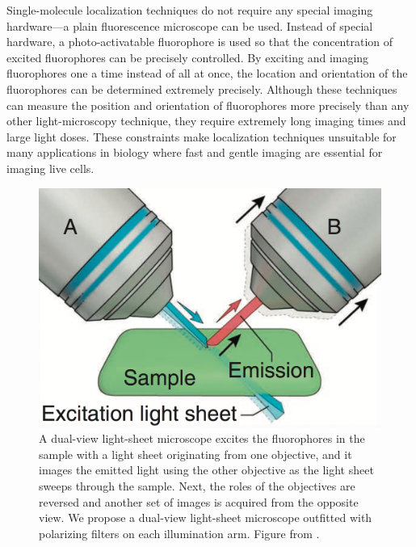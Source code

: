 \documentclass[11pt]{article}
\begin{document}
Single-molecule localization techniques do not require any special imaging
hardware---a plain fluorescence microscope can be used. Instead of special
hardware, a photo-activatable fluorophore is used so that the concentration of
excited fluorophores can be precisely controlled. By exciting and imaging
fluorophores one a time instead of all at once, the location and orientation of
the fluorophores can be determined extremely precisely. Although these techniques
can measure the position and orientation of fluorophores more precisely than any
other light-microscopy technique, they require extremely long imaging times and
large light doses. These constraints make localization techniques unsuitable for
many applications in biology where fast and gentle imaging are essential for
imaging live cells.

\begin{figure}[t]
\centering
\begin{minipage}{.45\textwidth}
  \centering
  \includegraphics[width=\textwidth, interpolate=true]{figs/light-sheet}
  \caption{A dual-view light-sheet microscope excites the fluorophores in the
    sample with a light sheet originating from one objective, and it images the
    emitted light using the other objective as the light sheet sweeps through
    the sample. Next, the roles of the objectives are reversed and another set
    of images is acquired from the opposite view. We propose a dual-view
    light-sheet microscope outfitted with polarizing filters on each illumination
    arm. Figure from \cite{wu2013}.}
  \label{fig:dispim}
\end{minipage}%
\hspace{0.75em}
\begin{minipage}{.45\textwidth}

\end{minipage}
\end{figure}
\end{document}
